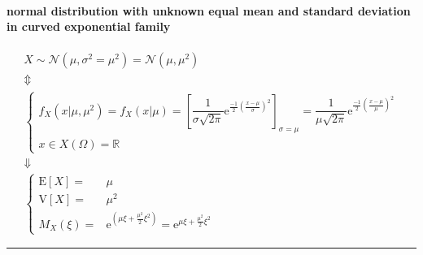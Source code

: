 \documentclass[
]{book}
\theoremstyle{definition}
\theoremstyle{definition}
\theoremstyle{definition}
\theoremstyle{definition}
\theoremstyle{remark}
\begin{document}
\paragraph{normal distribution with unknown equal mean and standard deviation in curved exponential family}\label{normal-distribution-with-unknown-equal-mean-and-standard-deviation-in-curved-exponential-family}

\[
\begin{array}{c}
X\sim\mathcal{N}\left(\mu,\sigma^{2}=\mu^{2}\right)=\mathcal{N}\left(\mu,\mu^{2}\right)\\
\Updownarrow\\
\begin{cases}
f_{{\scriptscriptstyle X}}\left(x|\mu,\mu^{2}\right)=f_{{\scriptscriptstyle X}}\left(x|\mu\right)=\left[\dfrac{1}{\sigma\sqrt{2\pi}}\mathrm{e}^{\frac{-1}{2}\left(\frac{x-\mu}{\sigma}\right)^{2}}\right]_{\sigma=\mu}=\dfrac{1}{\mu\sqrt{2\pi}}\mathrm{e}^{\frac{-1}{2}\left(\frac{x-\mu}{\mu}\right)^{2}}\\
x\in X\left(\Omega\right)=\mathbb{R}
\end{cases}\\
\Downarrow\\
\begin{cases}
\mathrm{E}\left[X\right]= & \mu\\
\mathrm{V}\left[X\right]= & \mu^{2}\\
M_{{\scriptscriptstyle X}}\left(\xi\right)= & \mathrm{e}^{\left(\mu\xi+\frac{\mu^{2}}{2}\xi^{2}\right)}=\mathrm{e}^{\mu\xi+\frac{\mu^{2}}{2}\xi^{2}}
\end{cases}
\end{array}
\]

\begin{center}\rule{0.5\linewidth}{0.5pt}\end{center}
\end{document}
